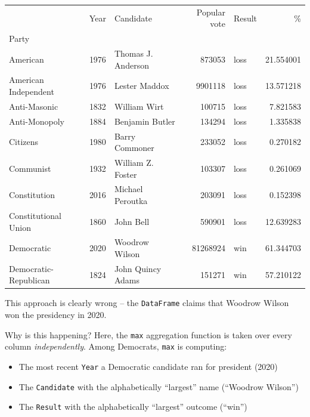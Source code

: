 \documentclass[
  letterpaper,
  DIV=11,
  numbers=noendperiod]{scrreprt}
\providecommand{\tightlist}{%
  \setlength{\itemsep}{0pt}\setlength{\parskip}{0pt}}\usepackage{longtable,booktabs,array}
\begin{document}
\begin{tabular}{lrlrlr}
\toprule
{} &  Year &           Candidate &  Popular vote & Result &          \% \\
Party                 &       &                     &               &        &            \\
\midrule
American              &  1976 &  Thomas J. Anderson &        873053 &   loss &  21.554001 \\
American Independent  &  1976 &       Lester Maddox &       9901118 &   loss &  13.571218 \\
Anti-Masonic          &  1832 &        William Wirt &        100715 &   loss &   7.821583 \\
Anti-Monopoly         &  1884 &     Benjamin Butler &        134294 &   loss &   1.335838 \\
Citizens              &  1980 &      Barry Commoner &        233052 &   loss &   0.270182 \\
Communist             &  1932 &   William Z. Foster &        103307 &   loss &   0.261069 \\
Constitution          &  2016 &    Michael Peroutka &        203091 &   loss &   0.152398 \\
Constitutional Union  &  1860 &           John Bell &        590901 &   loss &  12.639283 \\
Democratic            &  2020 &      Woodrow Wilson &      81268924 &    win &  61.344703 \\
Democratic-Republican &  1824 &   John Quincy Adams &        151271 &    win &  57.210122 \\
\bottomrule
\end{tabular}

This approach is clearly wrong -- the \texttt{DataFrame} claims that
Woodrow Wilson won the presidency in 2020.

Why is this happening? Here, the \texttt{max} aggregation function is
taken over every column \emph{independently}. Among Democrats,
\texttt{max} is computing:

\begin{itemize}
\tightlist
\item
  The most recent \texttt{Year} a Democratic candidate ran for president
  (2020)
\item
  The \texttt{Candidate} with the alphabetically ``largest'' name
  (``Woodrow Wilson'')
\item
  The \texttt{Result} with the alphabetically ``largest'' outcome
  (``win'')
\end{itemize}
\end{document}
